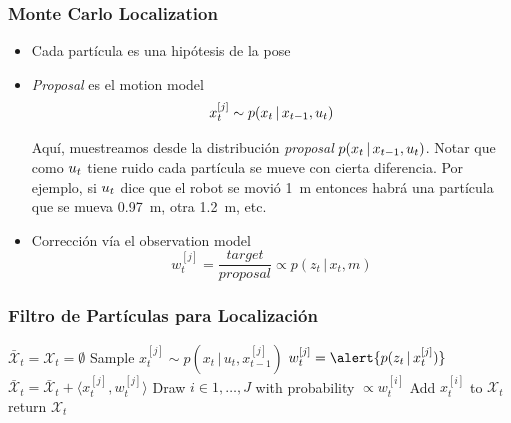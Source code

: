 \begin{frame}
    \frametitle{Monte Carlo Localization}

    \begin{itemize}
        \item Cada partícula es una hipótesis de la pose
        \item \emph{Proposal} es el motion model
        \begin{equation*}
            x_t^{[j]} \sim p(x_{t} \, | \, x_{t-1}, u_{t})
        \end{equation*}

        Aquí, muestreamos desde la distribución \emph{proposal} $p(x_{t} \, | \, x_{t-1}, u_{t})$. Notar que como $u_{t}$ tiene ruido cada partícula se mueve con cierta diferencia. Por ejemplo, si $u_{t}$ dice que el robot se movió \SI{1}{\meter} entonces habrá una partícula que se mueva \SI{0.97}{\meter}, otra \SI{1.2}{\meter}, etc.

        \item Corrección vía el observation model 
        \begin{equation*}
            w_t^{[j]} = \frac{target}{proposal} \propto p(z_t \, | \, x_t, m)
        \end{equation*}
    \end{itemize}
\end{frame}

    
\begin{frame}
    \frametitle{Filtro de Partículas para Localización}

    \begin{algorithmic}[1]
        \State $\bar{\mathcal{X}}_t = \mathcal{X}_t = \emptyset$
            \State Sample \alert{$x_t^{[j]} \sim p(x_t \, | \, u_t, x_{t-1}^{[j]})$}
            \State $w_t^{[j]} = \alert{p(z_t \, | \, x_t^{[j]})}$
            \State $\bar{\mathcal{X}}_t = \bar{\mathcal{X}}_t + \langle x_t^{[j]}, w_t^{[j]}\rangle$
        \EndFor
            \State Draw $i \in 1,\ldots,J$ with probability $\propto w_t^{[i]}$
            \State Add $x_t^{[i]}$ to $\mathcal{X}_t$
        \EndFor
        \State return $\mathcal{X}_t$
    \EndProcedure
    \end{algorithmic}
\end{frame}
    

